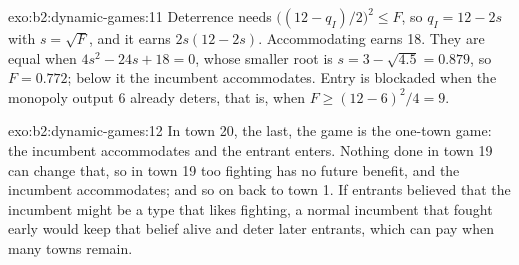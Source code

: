 \begin{solution}{exo:b2:dynamic-games:11}
Deterrence needs $\big((12 - q_I)/2\big)^2 \le F$, so $q_I = 12 - 2s$ with $s = \sqrt F$, and it earns $2s(12 - 2s)$. Accommodating
earns 18. They are equal when $4s^2 - 24s + 18 = 0$, whose smaller root is $s = 3 - \sqrt{4.5} = 0.879$, so $F = 0.772$; below it
the incumbent accommodates. Entry is blockaded when the monopoly output 6 already deters, that is, when $F \ge
(12 - 6)^2/4 = 9$.
\end{solution}

\begin{solution}{exo:b2:dynamic-games:12}
In town 20, the last, the game is the one-town game: the incumbent accommodates and the entrant enters. Nothing
done in town 19 can change that, so in town 19 too fighting has no future benefit, and the incumbent accommodates;
and so on back to town 1. If entrants believed that the incumbent might be a type that likes fighting, a normal
incumbent that fought early would keep that belief alive and deter later entrants, which can pay when many towns
remain.
\end{solution}

